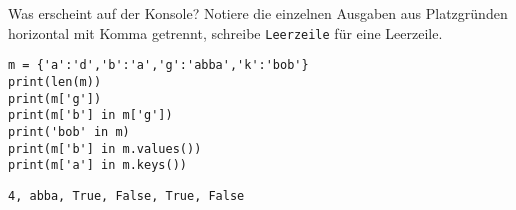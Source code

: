 \question[3] Was erscheint auf der Konsole?
Notiere die einzelnen Ausgaben aus Platzgründen horizontal mit Komma getrennt,
schreibe \texttt{Leerzeile} für eine Leerzeile.
\begin{lstlisting}
m = {'a':'d','b':'a','g':'abba','k':'bob'}
print(len(m))
print(m['g'])
print(m['b'] in m['g'])
print('bob' in m)
print(m['b'] in m.values())
print(m['a'] in m.keys())
\end{lstlisting}
\begin{solutionbox}{1cm}
\texttt{4, abba, True, False, True, False}
\end{solutionbox}
